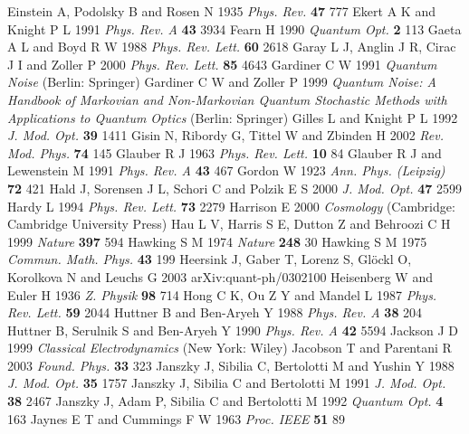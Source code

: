 \documentclass[12pt,amsmath,amssymb]{article}
\numberwithin{equation}{section}
\begin{document}
\begin{thebibliography}{999}
Einstein A, Podolsky B and Rosen N 1935 {\it Phys. Rev.} {\bf 47} 777
Ekert A K and Knight P L 1991
{\it Phys. Rev. A} {\bf 43} 3934
Fearn H 1990 {\it Quantum Opt.} {\bf 2} 113
Gaeta A L and Boyd R W 1988
{\it Phys. Rev. Lett.} {\bf 60} 2618
Garay L J, Anglin J R, Cirac J I and Zoller P 2000
{\it Phys. Rev. Lett.} {\bf 85} 4643
Gardiner C W 1991
{\it Quantum Noise}
(Berlin: Springer)
Gardiner C W and Zoller P 1999
{\it Quantum Noise:
A Handbook of Markovian and Non-Markovian
Quantum Stochastic Methods with Applications to Quantum Optics}
(Berlin: Springer)
Gilles L and Knight P L 1992
{\it J. Mod. Opt.} {\bf 39} 1411
Gisin N, Ribordy G, Tittel W and Zbinden H 2002
{\it Rev. Mod. Phys.} {\bf 74} 145
Glauber R J 1963 {\it Phys. Rev. Lett.} {\bf 10} 84
Glauber R J and Lewenstein M 1991
{\it Phys. Rev. A} {\bf 43} 467
Gordon W 1923
{\it Ann. Phys. (Leipzig)} {\bf 72} 421
Hald J, Sorensen J L, Schori C and Polzik E S 2000
{\it J. Mod. Opt.} {\bf 47} 2599
Hardy L 1994
{\it Phys. Rev. Lett.} {\bf 73} 2279
Harrison E 2000
{\it Cosmology}
(Cambridge: Cambridge University Press)
Hau L V, Harris S E, Dutton Z and Behroozi C H 1999
{\it Nature} {\bf 397} 594
Hawking S M 1974
{\it Nature} {\bf 248} 30
Hawking S M 1975
{\it Commun. Math. Phys.} {\bf 43} 199
Heersink J, Gaber T, Lorenz S, Gl\"ockl O, Korolkova N and Leuchs G 2003
arXiv:quant-ph/0302100
Heisenberg W and Euler H 1936
{\it Z. Physik} {\bf 98} 714
Hong C K, Ou Z Y and Mandel L 1987
{\it Phys. Rev. Lett.} {\bf 59} 2044
Huttner B and Ben-Aryeh Y 1988
{\it Phys. Rev. A} {\bf 38} 204
Huttner B, Serulnik S and Ben-Aryeh Y 1990
{\it Phys. Rev. A} {\bf 42} 5594
Jackson J D 1999
{\it Classical Electrodynamics}
(New York: Wiley)
Jacobson T and Parentani R 2003
{\it Found. Phys.} {\bf 33} 323
Janszky J, Sibilia C, Bertolotti M and Yushin Y 1988
{\it J. Mod. Opt.} {\bf 35} 1757
Janszky J, Sibilia C and Bertolotti M 1991
{\it J. Mod. Opt.} {\bf 38} 2467
Janszky J, Adam P, Sibilia C and Bertolotti M 1992
{\it Quantum Opt.} {\bf 4} 163
Jaynes E T and Cummings F W 1963
{\it Proc. IEEE} {\bf 51} 89

\end{thebibliography}
\end{document}
